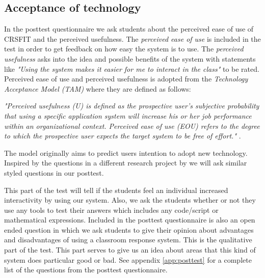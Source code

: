\subsection{Acceptance of technology}
In the posttest questionnaire we ask students about the perceived ease of use of CRSFIT and the perceived usefulness. The \emph{perceived ease of use} is included in the test in order to get feedback on how easy the system is to use. The \emph{perceived usefulness} asks into the idea and possible benefits of the system with statements like \emph{"Using the system makes it easier for me to interact in the class"} to be rated. Perceived ease of use and perceived usefulness is adopted from the \emph{Technology Acceptance Model (TAM)} \cite{siau2006use,davis1989user} where they are defined as follows:

\emph{"Perceived usefulness (U) is defined as the prospective user's subjective probability that using a specific application system will increase his or her job performance within an organizational context. Perceived ease of use (EOU) refers to the degree to which the prospective user expects the target system to be free of effort."} \cite[p.~985]{davis1989user}.

The model originally aims to predict users intention to adopt new technology. Inspired by the questions in a different research project by  we will ask similar styled questions in our posttest.

This part of the test will tell if the students feel an individual increased interactivity by using our system. Also, we ask the students whether or not they use any tools to test their answers which includes any code/script or mathematical expressions. Included in the posttest questionnaire is also an open ended question in which we ask students to give their opinion about advantages and disadvantages of using a classroom response system. This is the qualitative part of the test. This part serves to give us an idea about areas that this kind of system does particular good or bad. See appendix \ref{app:posttest} for a complete list of the questions from the posttest questionnaire.


